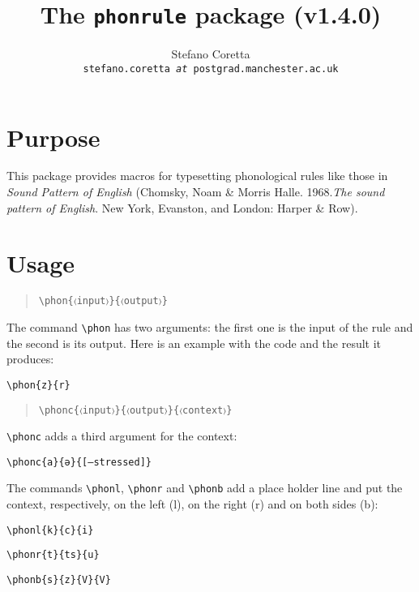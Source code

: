 \documentclass[a4paper]{article}
\title{The \texttt{phonrule} package (v1.4.0)}
\author{Stefano Coretta \\ \texttt{stefano.coretta \textit{at} postgrad.manchester.ac.uk}}
\begin{document}
\maketitle

\section{Purpose}
This package provides macros for typesetting phonological rules like those in \textit{Sound Pattern of English} (Chomsky, Noam \& Morris Halle. 1968.\textit{The sound pattern of English}. New York, Evanston, and London: Harper \& Row).

\section{Usage}

\begin{quote}
\begin{lstlisting}
\phon{〈input〉}{〈output〉}
\end{lstlisting}
\end{quote}

The command \verb+\phon+ has two arguments: the first one is the input of the rule and the second is its output.
Here is an example with the code and the result it produces:

\begin{exe}
\ex \verb+\phon{z}{r}+
\ex {}
\end{exe}

\begin{quote}
\begin{lstlisting}
\phonc{〈input〉}{〈output〉}{〈context〉}
\end{lstlisting}
\end{quote}

\verb+\phonc+ adds a third argument for the context:

\begin{exe}
\ex \verb+\phonc{a}{ə}{[–stressed]}+
\ex {}
\end{exe}

The commands \verb+\phonl+, \verb+\phonr+ and \verb+\phonb+ add a place holder line and put the context, respectively, on the left (l), on the right (r) and on both sides (b):

\begin{exe}
\ex
    \begin{xlist}
    \ex \verb+\phonl{k}{c}{i}+
    \ex {}
    \end{xlist}
\ex
    \begin{xlist}
    \ex \verb+\phonr{t}{ts}{u}+
    \ex {}
    \end{xlist}
\ex
    \begin{xlist}
    \ex \verb+\phonb{s}{z}{V}{V}+
    \ex {}
    \end{xlist}
\end{exe}
\end{document}
